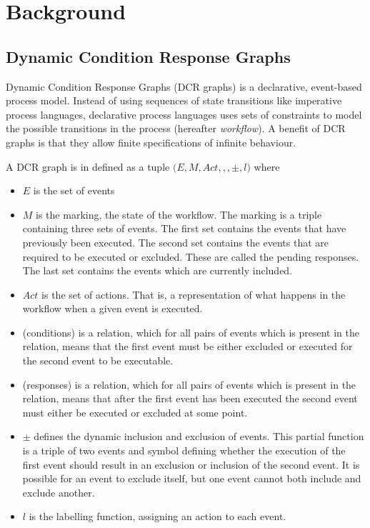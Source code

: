 \chapter{Background}\label{chap:background}
	\section{Dynamic Condition Response Graphs}\label{sec:background:dcrgraphs}
	Dynamic Condition Response Graphs (DCR graphs) is a declarative, event-based process model. Instead of using sequences of state transitions like imperative process languages, declarative process languages uses sets of constraints to model the possible transitions in the process (hereafter \textit{workflow}). A benefit of DCR graphs is that they allow finite specifications of infinite behaviour.

	
	\newpar A DCR graph is in \cite{hildebrandt2011declarative} defined as a tuple $(E, M, Act, $\condition$, $\response$, \pm, l)$ where
	\begin{itemize}
		\item $E$ is the set of events
		\item $M$ is the marking, the state of the workflow. The marking is a triple containing three sets of events. The first set contains the events that have previously been executed. The second set contains the events that are required to be executed or excluded. These are called the pending responses. The last set contains the events which are currently included.
		\item $Act$ is the set of actions. That is, a representation of what happens in the workflow when a given event is executed.
		\item \condition (conditions) is a relation, which for all pairs of events which is present in the relation, means that the first event must be either excluded or executed for the second event to be executable.
		\item \response (responses) is a relation, which for all pairs of events which is present in the relation, means that after the first event has been executed the second event must either be executed or excluded at some point.
		\item $\pm$ defines the dynamic inclusion and exclusion of events. This partial function is a triple of two events and symbol defining whether the execution of the first event should result in an exclusion or inclusion of the second event. It is possible for an event to exclude itself, but one event cannot both include and exclude another.
		\item $l$ is the labelling function, assigning an action to each event.
	\end{itemize}
		
